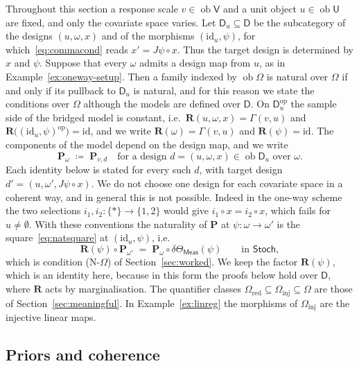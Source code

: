 \documentclass[11pt,a4paper]{article}
\theoremstyle{plain}
\theoremstyle{definition}
\theoremstyle{remark}
\newcommand{\cat}[1]{\mathsf{#1}}
\newcommand{\catU}{\cat{U}}
\newcommand{\catV}{\cat{V}}
\newcommand{\catO}{\cat{\Omega}}
\newcommand{\catD}{\cat{D}}
\newcommand{\Meas}{\cat{Meas}}
\newcommand{\Stoch}{\cat{Stoch}}
\newcommand{\op}{\mathrm{op}}
\newcommand{\id}{\mathrm{id}}
\newcommand{\del}{\delta}
\DeclareMathOperator{\ob}{ob}
\begin{document}
Throughout this section a response scale $v \in \ob\catV$ and a unit object
$u \in \ob\catU$ are fixed, and only the covariate space varies. Let
$\catD_{u} \subseteq \catD$ be the subcategory of the designs $(u,\omega,x)$
and of the morphisms $(\id_{u},\psi)$, for which~\eqref{eq:commacond} reads
$x' = J\psi \circ x$. Thus the target design is determined by $x$ and $\psi$.
Suppose that every $\omega$ admits a design map from $u$, as in
Example~\ref{ex:oneway-setup}. Then a family indexed by $\ob\catO$ is natural
over $\catO$ if and only if its pullback to $\catD_{u}$ is natural, and for
this reason we state the conditions over $\catO$ although the models are
defined over $\catD$. On $\catD_{u}^{\op}$ the sample side of the bridged model
is constant, i.e.\ $\mathbf{R}(u,\omega,x) = \Gamma(v,u)$ and
$\mathbf{R}\bigl((\id_{u},\psi)^{\op}\bigr) = \id$, and we write
$\mathbf{R}(\omega) = \Gamma(v,u)$ and $\mathbf{R}(\psi) = \id$. The components
of the model depend on the design map, and we write
\[
\mathbf P_{\omega} \;\coloneqq\; \mathbf P_{v,d}
\quad\text{for a design } d = (u,\omega,x) \in \ob\catD_{u} \text{ over }
\omega .
\]
Each identity below is stated for every such $d$, with target design
$d' = (u,\omega',J\psi \circ x)$. We do not choose one design for each
covariate space in a coherent way, and in general this is not possible. Indeed
in the one-way scheme the two selections
$i_{1},i_{2} \colon \{*\} \to \{1,2\}$ would give $i_{1} \circ x = i_{2} \circ x$,
which fails for $u \neq \emptyset$. With these conventions the naturality of
$\mathbf P$ at $\psi \colon \omega \to \omega'$ is the
square~\eqref{eq:natsquare} at $(\id_{u},\psi)$, i.e.
\begin{equation}\label{eq:natfibre}
\mathbf{R}(\psi) \circ \mathbf P_{\omega'}
\;=\; \mathbf P_{\omega} \circ \del\Theta_\Meas(\psi)
\qquad\text{in } \Stoch ,
\end{equation}
which is condition (N-$\catO$) of Section~\ref{sec:worked}. We keep the factor
$\mathbf{R}(\psi)$, which is an identity here, because in this form the proofs
below hold over $\catD$, where $\mathbf{R}$ acts by marginalisation. The
quantifier classes
$\catO_{\mathrm{red}} \subseteq \catO_{\mathrm{inj}} \subseteq \catO$ are those
of Section~\ref{sec:meaningful}. In Example~\ref{ex:linreg} the morphisms of
$\catO_{\mathrm{inj}}$ are the injective linear maps.

\subsection{Priors and coherence}
\end{document}
